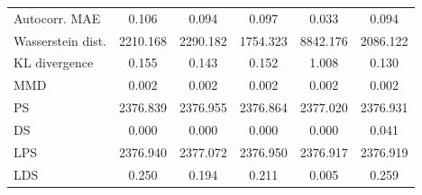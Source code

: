 \documentclass[make,article,submit,moreauthors]{Definitions/mdpi}
\begin{document}
\begin{longtable}{l ccccc}
\midrule

Autocorr. MAE           & 0.106 & 0.094 & 0.097 & 0.033 & 0.094 \\
Wasserstein dist.       & 2210.168 & 2290.182 & 1754.323 & 8842.176 & 2086.122 \\
KL divergence           & 0.155 & 0.143 & 0.152 & 1.008 & 0.130 \\
MMD                     & 0.002 & 0.002 & 0.002 & 0.002 & 0.002 \\
PS                      & 2376.839 & 2376.955 & 2376.864 & 2377.020 & 2376.931 \\
DS                      & 0.000 & 0.000 & 0.000 & 0.000 & 0.041 \\
LPS                     & 2376.940 & 2377.072 & 2376.950 & 2376.917 & 2376.919 \\
LDS                     & 0.250 & 0.194 & 0.211 & 0.005 & 0.259 \\

\end{longtable}
\end{document}
